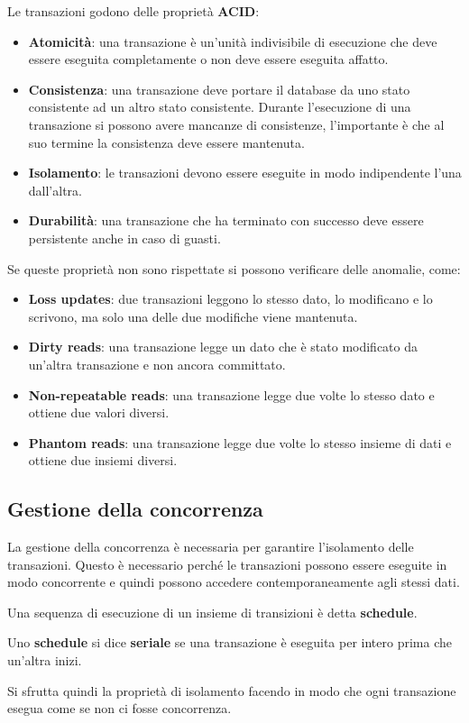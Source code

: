 Le transazioni godono delle proprietà \textbf{ACID}:
\begin{itemize}
      \item \textbf{Atomicità}: una transazione è un'unità indivisibile di
            esecuzione che deve essere eseguita completamente o non deve essere
            eseguita affatto.
      \item \textbf{Consistenza}: una transazione deve portare il database da uno
            stato consistente ad un altro stato consistente. Durante l'esecuzione
            di una transazione si possono avere mancanze di consistenze, l'importante
            è che al suo termine la consistenza deve essere mantenuta.
      \item \textbf{Isolamento}: le transazioni devono essere eseguite in modo
            indipendente l'una dall'altra.
      \item \textbf{Durabilità}: una transazione che ha terminato con successo
            deve essere persistente anche in caso di guasti.
\end{itemize}
Se queste proprietà non sono rispettate si possono verificare delle anomalie,
come:
\begin{itemize}
      \item \textbf{Loss updates}: due transazioni leggono lo stesso
            dato, lo modificano e lo scrivono, ma solo una delle due modifiche
            viene mantenuta.
      \item \textbf{Dirty reads}: una transazione legge un dato che è stato
            modificato da un'altra transazione e non ancora committato.
      \item \textbf{Non-repeatable reads}: una transazione legge due
            volte lo stesso dato e ottiene due valori diversi.
      \item \textbf{Phantom reads}: una transazione legge due volte lo stesso
            insieme di dati e ottiene due insiemi diversi.
\end{itemize}
\subsection{Gestione della concorrenza}
La gestione della concorrenza è necessaria per garantire l'isolamento delle
transazioni. Questo è necessario perché le transazioni possono essere eseguite
in modo concorrente e quindi possono accedere contemporaneamente agli stessi
dati.
\begin{definizione}
      Una sequenza di esecuzione di un insieme di transizioni è detta \textbf{schedule}.
\end{definizione}
\begin{definizione}
      Uno \textbf{schedule} si dice \textbf{seriale} se una transazione è eseguita
      per intero prima che un'altra inizi.
\end{definizione}
Si sfrutta quindi la proprietà di isolamento facendo in modo che ogni
transazione esegua come se non ci fosse concorrenza.

